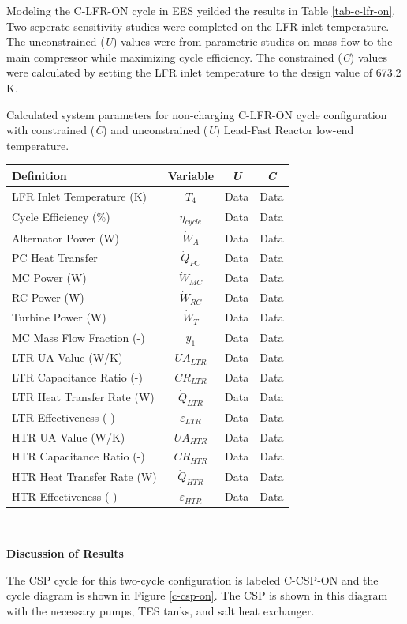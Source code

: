 \begin{paracol}{2}
\linenumbers
\switchcolumn

Modeling the C-LFR-ON cycle in EES yeilded the results in Table \ref{tab-c-lfr-on}. Two seperate sensitivity studies were completed on the LFR inlet temperature. The unconstrained (\textit{U}) values were from parametric studies on mass flow to the main compressor while maximizing cycle efficiency. The constrained (\textit{C}) values were calculated by setting the LFR inlet temperature to the design value of 673.2 K.

\begin{specialtable}[H] 
    \caption{Calculated system parameters for non-charging C-LFR-ON cycle configuration with constrained (\textit{C}) and unconstrained (\textit{U}) Lead-Fast Reactor low-end temperature.\label{tab-c-lfr-on}}
    \begin{tabular}{lccc}
    \toprule
    \textbf{Definition} & \textbf{Variable} & \textit{U} & \textit{C}\\
    \midrule
    LFR Inlet Temperature (K)	&	$T_{4}$	&	Data	&	Data	\\
    Cycle Efficiency (\%)	&	$\eta_{cycle}$	&	Data	&	Data	\\
    Alternator Power (W)	&	$\dot{W}_{A}$	&	Data	&	Data	\\
    PC Heat Transfer	&	$\dot{Q}_{PC}$	&	Data	&	Data	\\
    MC Power (W)	&	$\dot{W}_{MC}$	&	Data	&	Data	\\
    RC Power (W)	&	$\dot{W}_{RC}$	&	Data	&	Data	\\
    Turbine Power (W)	&	$\dot{W}_{T}$	&	Data	&	Data	\\
    MC Mass Flow Fraction (-)	&	$y_{1}$	&	Data	&	Data	\\
    LTR UA Value (W/K)	&	$UA_{LTR}$	&	Data	&	Data	\\
    LTR Capacitance Ratio (-)	&	$CR_{LTR}$	&	Data	&	Data	\\
    LTR Heat Transfer Rate (W)	&	$\dot{Q}_{LTR}$	&	Data	&	Data	\\
    LTR Effectiveness (-)	&	$\varepsilon_{LTR}$	&	Data	&	Data	\\
    HTR UA Value (W/K)	&	$UA_{HTR}$	&	Data	&	Data	\\
    HTR Capacitance Ratio (-)	&	$CR_{HTR}$	&	Data	&	Data	\\
    HTR Heat Transfer Rate (W)	&	$\dot{Q}_{HTR}$	&	Data	&	Data	\\
    HTR Effectiveness (-)	&	$\varepsilon_{HTR}$	&	Data	&	Data	\\
    \bottomrule
    \end{tabular}\\
\end{specialtable}

\textbf{Discussion of Results}

The CSP cycle for this two-cycle configuration is labeled C-CSP-ON and the cycle diagram is shown in Figure \ref{c-csp-on}. The CSP is shown in this diagram with the necessary pumps, TES tanks, and salt heat exchanger.

\end{paracol}
